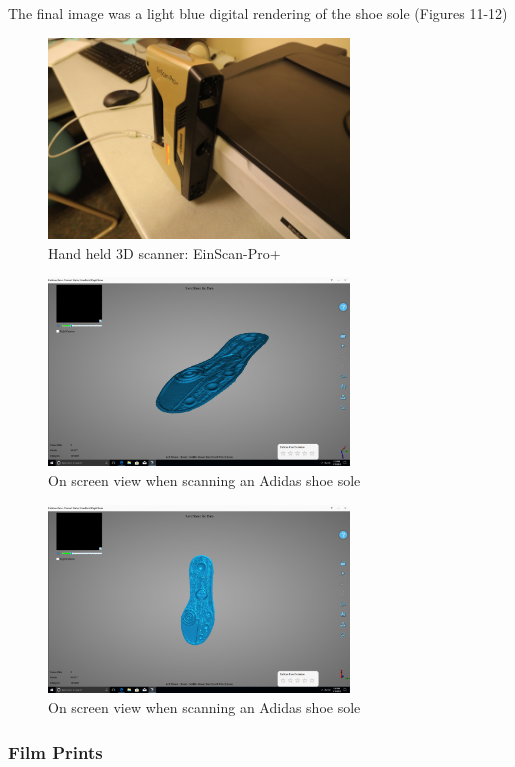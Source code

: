    The final image was a light blue digital rendering of the shoe sole (Figures 11-12)
   
\begin{figure}[!htp]
\centering
\includegraphics[width=8cm]{3D_Scanner}
\caption{Hand held 3D scanner: EinScan-Pro+}
\label{Image 10}
\end{figure}

\begin{figure}[!htp]
\centering
\includegraphics[width=8cm]{3D_Adidas}
\caption{On screen view when scanning an Adidas shoe sole}
\label{Image 11}
\end{figure}

\begin{figure}[!htp]
\centering
\includegraphics[width=8cm]{3D_Adidas_2}
\caption{On screen view when scanning an Adidas shoe sole}
\label{Image 12}
\end{figure}

\newpage

\subsubsection{Film Prints}

